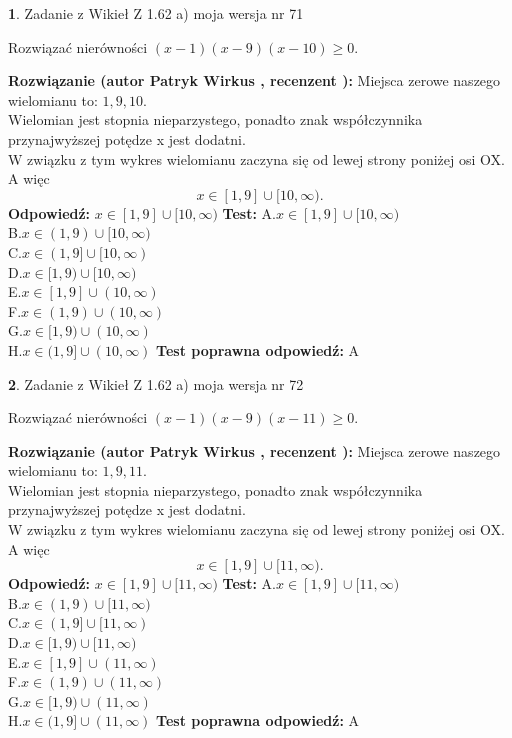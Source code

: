 \documentclass[12pt, a4paper]{article}
\theoremstyle{definition} %
\newtheorem{zad}{}
\newcommand{\zadStart}[1]{\begin{zad}#1\newline}
\newcommand{\zadStop}{\end{zad}}
\newcommand{\rozwStart}[2]{\noindent \textbf{Rozwiązanie (autor #1 , recenzent #2): }\newline}
\newcommand{\rozwStop}{\newline}
\newcommand{\odpStart}{\noindent \textbf{Odpowiedź:}\newline}
\newcommand{\odpStop}{\newline}
\newcommand{\testStart}{\noindent \textbf{Test:}\newline}
\newcommand{\testStop}{\newline}
\newcommand{\kluczStart}{\noindent \textbf{Test poprawna odpowiedź:}\newline}
\newcommand{\kluczStop}{\newline}
\begin{document}
\zadStart{Zadanie z Wikieł Z 1.62 a) moja wersja nr 71}

Rozwiązać nierówności $(x-1)(x-9)(x-10)\ge0$.
\zadStop
\rozwStart{Patryk Wirkus}{}
Miejsca zerowe naszego wielomianu to: $1, 9, 10$.\\
Wielomian jest stopnia nieparzystego, ponadto znak współczynnika przy\linebreak najwyższej potędze x jest dodatni.\\ W związku z tym wykres wielomianu zaczyna się od lewej strony poniżej osi OX. A więc $$x \in [1,9] \cup [10,\infty).$$
\rozwStop
\odpStart
$x \in [1,9] \cup [10,\infty)$
\odpStop
\testStart
A.$x \in [1,9] \cup [10,\infty)$\\
B.$x \in (1,9) \cup [10,\infty)$\\
C.$x \in (1,9] \cup [10,\infty)$\\
D.$x \in [1,9) \cup [10,\infty)$\\
E.$x \in [1,9] \cup (10,\infty)$\\
F.$x \in (1,9) \cup (10,\infty)$\\
G.$x \in [1,9) \cup (10,\infty)$\\
H.$x \in (1,9] \cup (10,\infty)$
\testStop
\kluczStart
A
\kluczStop



\zadStart{Zadanie z Wikieł Z 1.62 a) moja wersja nr 72}

Rozwiązać nierówności $(x-1)(x-9)(x-11)\ge0$.
\zadStop
\rozwStart{Patryk Wirkus}{}
Miejsca zerowe naszego wielomianu to: $1, 9, 11$.\\
Wielomian jest stopnia nieparzystego, ponadto znak współczynnika przy\linebreak najwyższej potędze x jest dodatni.\\ W związku z tym wykres wielomianu zaczyna się od lewej strony poniżej osi OX. A więc $$x \in [1,9] \cup [11,\infty).$$
\rozwStop
\odpStart
$x \in [1,9] \cup [11,\infty)$
\odpStop
\testStart
A.$x \in [1,9] \cup [11,\infty)$\\
B.$x \in (1,9) \cup [11,\infty)$\\
C.$x \in (1,9] \cup [11,\infty)$\\
D.$x \in [1,9) \cup [11,\infty)$\\
E.$x \in [1,9] \cup (11,\infty)$\\
F.$x \in (1,9) \cup (11,\infty)$\\
G.$x \in [1,9) \cup (11,\infty)$\\
H.$x \in (1,9] \cup (11,\infty)$
\testStop
\kluczStart
A
\kluczStop
\end{document}
